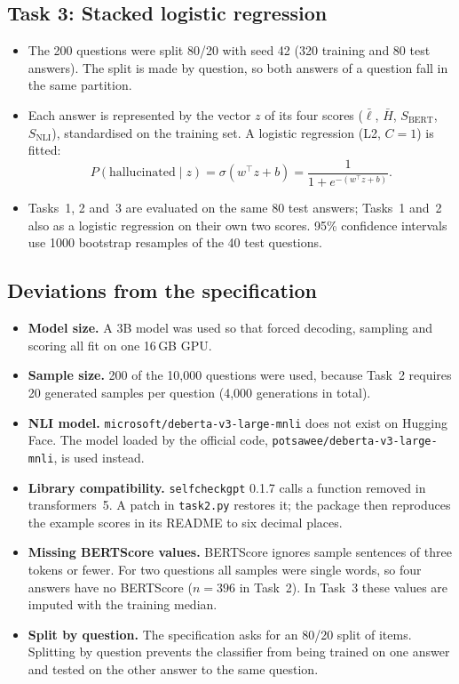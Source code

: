 \documentclass[11pt,a4paper]{article}
\begin{document}
\subsection{Task 3: Stacked logistic regression}

\begin{itemize}
  \item The 200 questions were split 80/20 with seed 42 (320 training and 80 test answers). The
        split is made by question, so both answers of a question fall in the same partition.
  \item Each answer is represented by the vector $z$ of its four scores ($\bar{\ell}$, $\bar{H}$,
        $S_{\text{BERT}}$, $S_{\text{NLI}}$), standardised on the training set. A logistic
        regression (L2, $C=1$) is fitted:
        \begin{equation}
        P(\text{hallucinated} \mid z) = \sigma(w^\top z + b) = \frac{1}{1 + e^{-(w^\top z + b)}} .
        \end{equation}
  \item Tasks~1, 2 and~3 are evaluated on the same 80 test answers; Tasks~1 and~2 also as a
        logistic regression on their own two scores. 95\% confidence intervals use 1000 bootstrap
        resamples of the 40 test questions.
\end{itemize}

\subsection{Deviations from the specification}

\begin{itemize}
  \item \textbf{Model size.} A 3B model was used so that forced decoding, sampling and scoring all
        fit on one 16\,GB GPU.
  \item \textbf{Sample size.} 200 of the 10{,}000 questions were used, because Task~2 requires 20
        generated samples per question (4{,}000 generations in total).
  \item \textbf{NLI model.} \texttt{microsoft/deberta-v3-large-mnli} does not exist on Hugging
        Face. The model loaded by the official code, \texttt{potsawee/deberta-v3-large-mnli}, is
        used instead.
  \item \textbf{Library compatibility.} \texttt{selfcheckgpt} 0.1.7 calls a function removed in
        transformers~5. A patch in \texttt{task2.py} restores it; the package then reproduces the
        example scores in its README to six decimal places.
  \item \textbf{Missing BERTScore values.} BERTScore ignores sample sentences of three tokens or
        fewer. For two questions all samples were single words, so four answers have no BERTScore
        ($n=396$ in Task~2). In Task~3 these values are imputed with the training median.
  \item \textbf{Split by question.} The specification asks for an 80/20 split of items. Splitting
        by question prevents the classifier from being trained on one answer and tested on the
        other answer to the same question.
\end{itemize}
\end{document}
